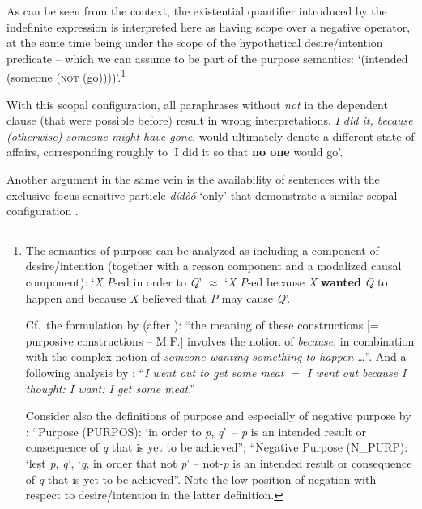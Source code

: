 \documentclass[output=paper,colorlinks,citecolor=brown]{langscibook}
\begin{document}
\noindent As can be seen from the context, the existential quantifier introduced by the indefinite expression is interpreted here as having scope over a negative operator, at the same time being under the scope of the hypothetical desire\slash intention predicate -- which we can assume to be part of the purpose semantics: `(intended (someone (\textsc{not} (go))))'.\footnote{The semantics of purpose can be analyzed as including a component of desire\slash intention (together with a reason component and a modalized causal component): `\textit{X} \textit{P}-ed in order to \textit{Q}' $\approx$ `\textit{X} \textit{P}-ed because \textit{X} \textbf{wanted} \textit{Q} to happen and because \textit{X} believed that \textit{P} may cause \textit{Q}'.

Cf.\ the formulation by \citet[44]{goddard1991} (after \citealt{wierzbicka1989}): ``the meaning of these constructions [= purposive constructions -- M.F.] involves the notion of \textit{because}, in combination with the complex notion of \textit{someone wanting something to happen}  {\dots}''. And a following analysis by \citet[409]{wierzbicka1992}: ``\textit{I went out to get some meat $=$ I went out because I thought: I want: I get some meat}.''

Consider also the definitions of purpose and especially of negative purpose by \citet[86]{kortmann1996}: ``Purpose (PURPOS): `in order to \textit{p}, \textit{q}'~-- \textit{p} is an intended result or consequence of \textit{q} that is yet to be achieved''; ``Negative Purpose (N\_PURP): `lest \textit{p}, \textit{q}', `\textit{q}, in order that not \textit{p}' -- not-\textit{p} is an intended result or consequence of \textit{q} that is yet to be achieved''. Note the low position of negation with respect to desire\slash intention in the latter definition.}


With this scopal configuration, all paraphrases without \textit{not} in the dependent clause (that were possible before) result in wrong interpretations. \textit{I did it, because (otherwise) someone might have gone}, would ultimately denote a different state of affairs, corresponding roughly to `I did it so that \textbf{no one} would go'.

Another argument in the same vein is the availability of sentences with the exclusive focus-sensitive particle \textit{dídòő} `only' that demonstrate a similar scopal configuration .



\z
\end{document}
